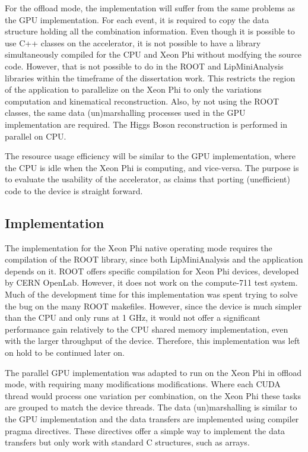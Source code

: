 For the offload mode, the implementation will suffer from the same problems as the GPU implementation. For each event, it is required to copy the data structure holding all the combination information. Even though it is possible to use C++ classes on the accelerator, it is not possible to have a library simultaneously compiled for the CPU and Xeon Phi without modfying the source code. However, that is not possible to do in the ROOT and LipMiniAnalysis libraries within the timeframe of the dissertation work. This restricts the region of the application to parallelize on the Xeon Phi to only the variations computation and kinematical reconstruction. Also, by not using the ROOT classes, the same data (un)marshalling processes used in the GPU implementation are required. The Higgs Boson reconstruction is performed in parallel on CPU.

The resource usage efficiency will be similar to the GPU implementation, where the CPU is idle when the Xeon Phi is computing, and vice-versa. The purpose is to evaluate the usability of the accelerator, as \intel claims that porting (unefficient) code to the device is straight forward.

\subsection{Implementation}
\label{MICImplementation}

The implementation for the Xeon Phi native operating mode requires the compilation of the ROOT library, since both LipMiniAnalysis and the application depends on it. ROOT offers specific compilation for \intel Xeon Phi devices, developed by CERN OpenLab. However, it does not work on the compute-711 test system. Much of the development time for this implementation was spent trying to solve the bug on the many ROOT makefiles. However, since the device is much simpler than the CPU and only runs at 1 GHz, it would not offer a significant performance gain relatively to the CPU shared memory implementation, even with the larger throughput of the device. Therefore, this implementation was left on hold to be continued later on.

The parallel GPU implementation was adapted to run on the Xeon Phi in offload mode, with requiring many modifications modifications. Where each CUDA thread would process one variation per combination, on the Xeon Phi these tasks are grouped to match the device threads. The data (un)marshalling is similar to the GPU implementation and the data transfers are implemented using compiler pragma directives. These directives offer a simple way to implement the data transfers but only work with standard C structures, such as arrays.

